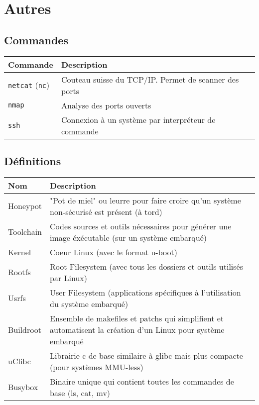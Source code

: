 \documentclass[resume]{subfiles}
\begin{document}
\section{Autres}
\subsection{Commandes}
\begin{table}[H]
\centering
\begin{tabular}{ll}
Commande & Description\\\hline
\verb!netcat! (\verb!nc!) & Couteau suisse du TCP/IP. Permet de scanner des ports\\
\verb!nmap! & Analyse des ports ouverts\\
\verb!ssh! & Connexion à un système par interpréteur de commande
\end{tabular}
\end{table}

\subsection{Définitions}
\begin{table}[H]
\begin{tabular}{ll}
Nom & Description\\\hline
Honeypot & "Pot de miel" ou leurre pour faire croire qu'un système non-sécurisé est présent (à tord)\\
Toolchain & Codes sources et outils nécessaires pour générer une image éxécutable (sur un système embarqué)\\
Kernel & Coeur Linux (avec le format u-boot)\\
Rootfs & Root Filesystem (avec tous les dossiers et outils utilisés par Linux)\\
Usrfs & User Filesystem (applications spécifiques à l'utilisation du système embarqué)\\
Buildroot & Ensemble de makefiles et patchs qui simplifient et automatisent la création d'un Linux pour système embarqué\\
uClibc & Librairie c de base similaire à glibc mais plus compacte (pour systèmes MMU-less)\\
Busybox & Binaire unique qui contient toutes les commandes de base (ls, cat, mv)
\end{tabular}
\end{table}
\end{document}
